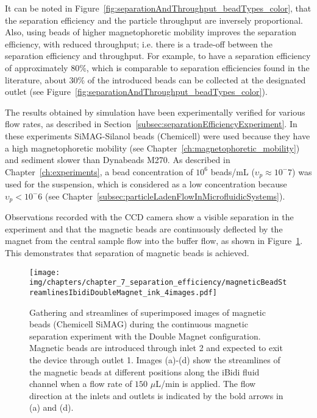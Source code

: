 It can be noted in Figure~\ref{fig:separationAndThroughput_beadTypes_color}, that the separation efficiency and the particle throughput are inversely proportional. Also, using beads of higher magnetophoretic mobility improves the separation efficiency, with reduced throughput; i.e. there is a trade-off between the separation efficiency and throughput. For example, to have a separation efficiency of approximately $80\%$, which is comparable to separation efficiencies found in the literature, about $30\%$ of the introduced beads can be collected at the designated outlet (see Figure~\ref{fig:separationAndThroughput_beadTypes_color}).

The results obtained by simulation have been experimentally verified for various flow rates, as described in Section~\ref{subsec:separationEfficiencyExperiment}. In these experiments SiMAG-Silanol beads (Chemicell) were used because they have a high magnetophoretic mobility (see Chapter~\ref{ch:magnetophoretic_mobility}) and sediment slower than Dynabeads M270. As described in Chapter~\ref{ch:experiments}, a bead concentration of $10^{6}$ beads/mL ($\upsilon_{p}\approx10^-7$) was used for the suspension, which is considered as a low concentration because $\upsilon_{p}<10^-6$ (see Chapter~\ref{subsec:particleLadenFlowInMicrofluidicSystems}).

Observations recorded with the CCD camera show a visible separation in the experiment and that the magnetic beads are continuously deflected by the magnet from the central sample flow into the buffer flow, as shown in Figure~\ref{fig:continuousMagneticSeparationExperimentDoubleMagnet}. This demonstrates that separation of magnetic beads is achieved. 

\begin{figure}[htb]
   \centering
   \texttt{[image: img/chapters/chapter\_7\_separation\_efficiency/magneticBeadStreamlinesIbidiDoubleMagnet\_ink\_4images.pdf]}
   \caption[Magnetic separation experiment of the Double Magnet configuration in continuous flow]{Gathering and streamlines of superimposed images of magnetic beads (Chemicell SiMAG) during the continuous magnetic separation experiment with the Double Magnet configuration. Magnetic beads are introduced through inlet 2 and expected to exit the device through outlet 1. Images (a)-(d) show the streamlines of the magnetic beads at different positions along the iBidi fluid channel when a flow rate of $150$ $\mu$L/min is applied. The flow direction at the inlets and outlets is indicated by the bold arrows in (a) and (d). }
   \label{fig:continuousMagneticSeparationExperimentDoubleMagnet}
\end{figure}

